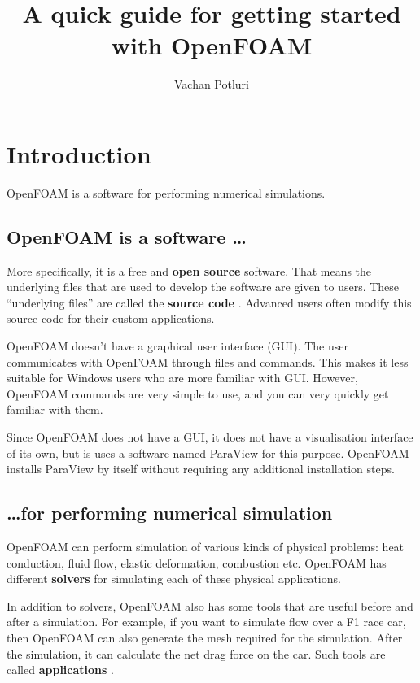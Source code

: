 \documentclass[10pt,a5paper]{article}
\newcommand{\keyword}[1]{%
    \textcolor{keywordcolor}{\bfseries #1}
    \marginnote{\parbox[1]{\marginparwidth}{\raggedright\footnotesize\bfseries\textcolor{keywordcolor}{#1}}}
}
\newcommand{\openfoam}{\software{OpenFOAM}}
\newcommand{\paraview}{\software{ParaView}}
\newcommand{\software}[1]{\textsf{#1}}
\newcommand{\windows}{\software{Windows}}
\begin{document}
\sloppy

\title{A quick guide for getting started with \openfoam}
\author{Vachan Potluri}
\maketitle

\tableofcontents

\section{Introduction}
\label{sec:intro}
\openfoam{} is a software for performing numerical simulations.

\subsection{\openfoam{} is a software \ldots}
\label{sec:intro_subsec:software}
More specifically, it is a free and \keyword{open source} software. That means the underlying files that are used to develop the software are given to users. These \enquote{underlying files} are called the \keyword{source code}. Advanced users often modify this source code for their custom applications.

\par \openfoam{} doesn't have a graphical user interface (GUI). The user communicates with \openfoam{} through files and commands. This makes it less suitable for \windows{} users who are more familiar with GUI. However, \openfoam{} commands are very simple to use, and you can very quickly get familiar with them.

\par Since \openfoam{} does not have a GUI, it does not have a visualisation interface of its own, but is uses a software named \paraview{} for this purpose. \openfoam{} installs \paraview{} by itself without requiring any additional installation steps.

\subsection{\ldots for performing numerical simulation}
\label{sec:intro_subsec:simulation}
\openfoam{} can perform simulation of various kinds of physical problems: heat conduction, fluid flow, elastic deformation, combustion etc. \openfoam{} has different \keyword{solvers} for simulating each of these physical applications.

\par In addition to solvers, \openfoam{} also has some tools that are useful before and after a simulation. For example, if you want to simulate flow over a F1 race car, then \openfoam{} can also generate the mesh required for the simulation. After the simulation, it can calculate the net drag force on the car. Such tools are called \keyword{applications}.
\end{document}
